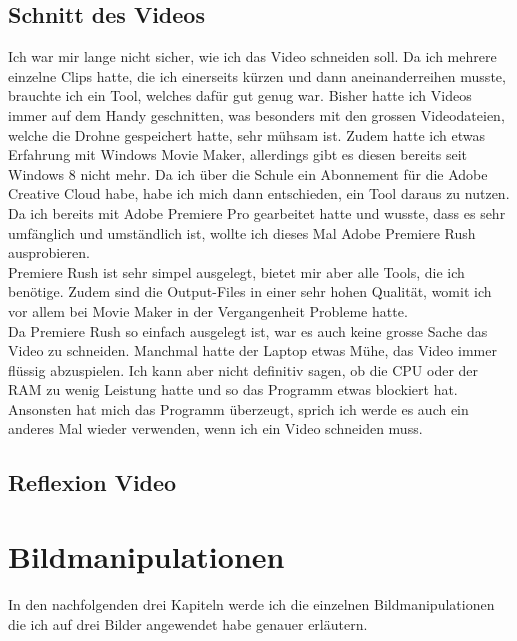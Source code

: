 \documentclass[11pt]{article}
\begin{document}
    \subsection{Schnitt des Videos}
    Ich war mir lange nicht sicher, wie ich das Video schneiden soll. Da ich mehrere einzelne Clips hatte, die ich einerseits kürzen und dann
    aneinanderreihen musste, brauchte ich ein Tool, welches dafür gut genug war. Bisher hatte ich Videos immer auf dem Handy geschnitten, was
    besonders mit den grossen Videodateien, welche die Drohne gespeichert hatte, sehr mühsam ist. Zudem hatte ich etwas Erfahrung mit Windows
    Movie Maker, allerdings gibt es diesen bereits seit Windows 8 nicht mehr. Da ich über die Schule ein Abonnement für die Adobe Creative Cloud
    habe, habe ich mich dann entschieden, ein Tool daraus zu nutzen. Da ich bereits mit Adobe Premiere Pro gearbeitet hatte und wusste, dass
    es sehr umfänglich und umständlich ist, wollte ich dieses Mal Adobe Premiere Rush ausprobieren.\\
    Premiere Rush ist sehr simpel ausgelegt, bietet mir aber alle Tools, die ich benötige. Zudem sind die Output-Files in einer sehr hohen
    Qualität, womit ich vor allem bei Movie Maker in der Vergangenheit Probleme hatte.\\
    Da Premiere Rush so einfach ausgelegt ist, war es auch keine grosse Sache das Video zu schneiden. Manchmal hatte der Laptop etwas Mühe,
    das Video immer flüssig abzuspielen. Ich kann aber nicht definitiv sagen, ob die CPU oder der RAM zu wenig Leistung hatte und so das Programm
    etwas blockiert hat.\\
    Ansonsten hat mich das Programm überzeugt, sprich ich werde es auch ein anderes Mal wieder verwenden, wenn ich ein Video schneiden muss.

    \subsection{Reflexion Video}

    \section{Bildmanipulationen}
    In den nachfolgenden drei Kapiteln werde ich die einzelnen Bildmanipulationen die ich auf drei Bilder angewendet habe genauer erläutern.

\end{document}
